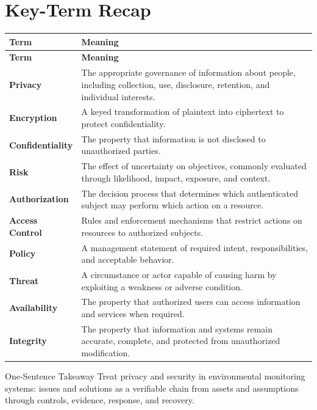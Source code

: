 \documentclass[11pt,letterpaper]{article}
\begin{document}
\section*{Key-Term Recap}
\begin{longtable}{>{\raggedright\arraybackslash}p{}>{\raggedright\arraybackslash}p{}}
\toprule\rowcolor{Navy}\color{white}\textbf{Term} & \color{white}\textbf{Meaning}\\\midrule
\endfirsthead
\toprule\rowcolor{Navy}\color{white}\textbf{Term} & \color{white}\textbf{Meaning}\\\midrule
\endhead
\textbf{Privacy} & The appropriate governance of information about people, including collection, use, disclosure, retention, and individual interests. \\\midrule
\textbf{Encryption} & A keyed transformation of plaintext into ciphertext to protect confidentiality. \\\midrule
\textbf{Confidentiality} & The property that information is not disclosed to unauthorized parties. \\\midrule
\textbf{Risk} & The effect of uncertainty on objectives, commonly evaluated through likelihood, impact, exposure, and context. \\\midrule
\textbf{Authorization} & The decision process that determines which authenticated subject may perform which action on a resource. \\\midrule
\textbf{Access Control} & Rules and enforcement mechanisms that restrict actions on resources to authorized subjects. \\\midrule
\textbf{Policy} & A management statement of required intent, responsibilities, and acceptable behavior. \\\midrule
\textbf{Threat} & A circumstance or actor capable of causing harm by exploiting a weakness or adverse condition. \\\midrule
\textbf{Availability} & The property that authorized users can access information and services when required. \\\midrule
\textbf{Integrity} & The property that information and systems remain accurate, complete, and protected from unauthorized modification. \\\midrule
\bottomrule
\end{longtable}
\begin{CornellExamBox}{One-Sentence Takeaway}
Treat privacy and security in environmental monitoring systems: issues and solutions as a verifiable chain from assets and assumptions through controls, evidence, response, and recovery.
\end{CornellExamBox}
\end{document}
